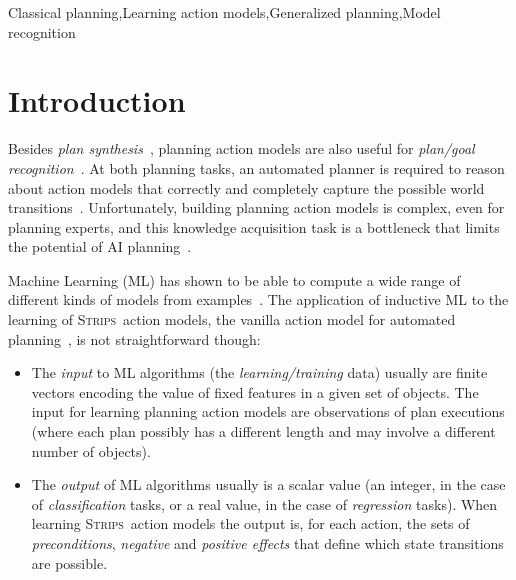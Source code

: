 \documentclass[3p,times]{elsarticle}
\newcommand{\strips}{\textsc{Strips}}     %
\begin{document}
\begin{frontmatter}
\begin{keyword}
Classical planning\sep Learning action models\sep Generalized planning\sep Model recognition

\end{keyword}

\end{frontmatter}






\section{Introduction}
\label{sec:Section1}
Besides {\em plan synthesis}~\cite{ghallab2004automated}, planning action models are also useful for {\em plan/goal recognition}~\cite{ramirez2012plan}. At both planning tasks, an automated planner is required to reason about action models that correctly and completely capture the possible world transitions~\cite{geffner:book:2013}. Unfortunately, building planning action models is complex, even for planning experts, and this knowledge acquisition task is a bottleneck that limits the potential of AI planning~\cite{kambhampati:modellite:AAAI2007}.

Machine Learning (ML) has shown to be able to compute a wide range of different kinds of models from examples~\cite{michalski2013machine}. The application of inductive ML to the learning of \strips\ action models, the vanilla action model for automated planning~\cite{fikes1971strips}, is not straightforward though:
\begin{itemize}
\item The {\em input} to ML algorithms (the {\em learning/training} data) usually are finite vectors encoding the value of fixed features in a given set of objects. The input for learning planning action models are observations of plan executions (where each plan possibly has a different length and may involve a different number of objects).
\item The {\em output} of ML algorithms usually is a scalar value (an integer, in the case of {\em classification} tasks, or a real value, in the case of {\em regression} tasks). When learning \strips\ action models the output is, for each action, the sets of {\em preconditions}, {\em negative} and {\em positive effects} that define which state transitions are possible.
\end{itemize}
\end{document}
